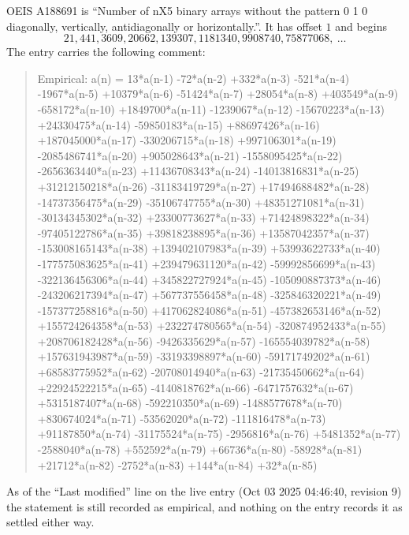 \documentclass[11pt,a4paper]{article}
\theoremstyle{plain}
\theoremstyle{definition}
\begin{document}
OEIS A188691 is ``Number of nX5 binary arrays without the pattern 0 1 0 diagonally, vertically, antidiagonally or horizontally.''. It has offset $1$ and begins
\[
21, 441, 3609, 20662, 139307, 1181340, 9908740, 75877068,\ \dots
\]
The entry carries the following comment:
\begin{quote}\small
Empirical: a(n) = 13*a(n-1) -72*a(n-2) +332*a(n-3) -521*a(n-4) -1967*a(n-5) +10379*a(n-6) -51424*a(n-7) +28054*a(n-8) +403549*a(n-9) -658172*a(n-10) +1849700*a(n-11) -1239067*a(n-12) -15670223*a(n-13) +24330475*a(n-14) -59850183*a(n-15) +88697426*a(n-16) +187045000*a(n-17) -330206715*a(n-18) +997106301*a(n-19) -2085486741*a(n-20) +905028643*a(n-21) -1558095425*a(n-22) -2656363440*a(n-23) +11436708343*a(n-24) -14013816831*a(n-25) +31212150218*a(n-26) -31183419729*a(n-27) +17494688482*a(n-28) -14737356475*a(n-29) -35106747755*a(n-30) +48351271081*a(n-31) -30134345302*a(n-32) +23300773627*a(n-33) +71424898322*a(n-34) -97405122786*a(n-35) +39818238895*a(n-36) +13587042357*a(n-37) -153008165143*a(n-38) +139402107983*a(n-39) +53993622733*a(n-40) -177575083625*a(n-41) +239479631120*a(n-42) -59992856699*a(n-43) -322136456306*a(n-44) +345822727924*a(n-45) -105090887373*a(n-46) -243206217394*a(n-47) +567737556458*a(n-48) -325846320221*a(n-49) -157377258816*a(n-50) +417062824086*a(n-51) -457382653146*a(n-52) +155724264358*a(n-53) +232274780565*a(n-54) -320874952433*a(n-55) +208706182428*a(n-56) -9426335629*a(n-57) -165554039782*a(n-58) +157631943987*a(n-59) -33193398897*a(n-60) -59171749202*a(n-61) +68583775952*a(n-62) -20708014940*a(n-63) -21735450662*a(n-64) +22924522215*a(n-65) -4140818762*a(n-66) -6471757632*a(n-67) +5315187407*a(n-68) -592210350*a(n-69) -1488577678*a(n-70) +830674024*a(n-71) -53562020*a(n-72) -111816478*a(n-73) +91187850*a(n-74) -31175524*a(n-75) -2956816*a(n-76) +5481352*a(n-77) -2588040*a(n-78) +552592*a(n-79) +66736*a(n-80) -58928*a(n-81) +21712*a(n-82) -2752*a(n-83) +144*a(n-84) +32*a(n-85)
\end{quote}
As of the ``Last modified'' line on the live entry (Oct 03 2025 04:46:40, revision 9) the statement is
still recorded as empirical, and nothing on the entry records it as settled either way.
\end{document}
